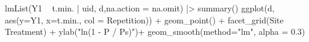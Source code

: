 \documentclass[
tikz
]{standalone}
\begin{document}
lmList(Y1 ~ t.min. | uid, d,na.action = na.omit) |> summary()
ggplot(d, aes(y=Y1, x=t.min., col = Repetition)) +
  geom_point() +
  facet_grid(Site ~ Treatment) + 
  ylab("ln(1 - P / Ps)")+
  geom_smooth(method="lm", alpha = 0.3)
\end{document}
